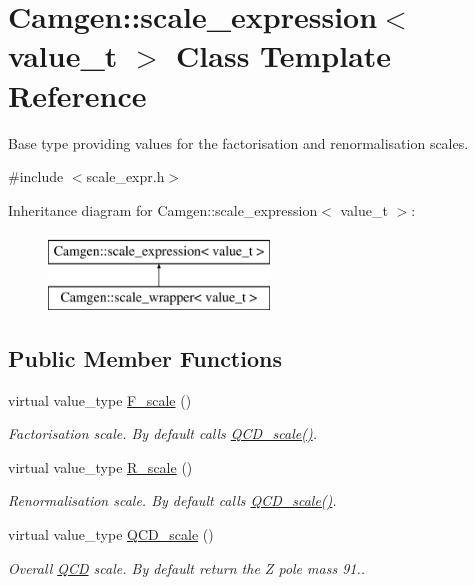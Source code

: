 \hypertarget{a00502}{}\section{Camgen\+:\+:scale\+\_\+expression$<$ value\+\_\+t $>$ Class Template Reference}
\label{a00502}


Base type providing values for the factorisation and renormalisation scales.  




{\ttfamily \#include $<$scale\+\_\+expr.\+h$>$}

Inheritance diagram for Camgen\+:\+:scale\+\_\+expression$<$ value\+\_\+t $>$\+:\begin{figure}[H]
\begin{center}
\leavevmode
\includegraphics[height=2.000000cm]{a00502}
\end{center}
\end{figure}
\subsection*{Public Member Functions}
\begin{DoxyCompactItemize}
\item 
\hypertarget{a00502_ae3e82d7b19e12aa8649fb97a5ae6e5ea}{}virtual value\+\_\+type \hyperlink{a00502_ae3e82d7b19e12aa8649fb97a5ae6e5ea}{F\+\_\+scale} ()\label{a00502_ae3e82d7b19e12aa8649fb97a5ae6e5ea}

\begin{DoxyCompactList}\small\item\em Factorisation scale. By default calls \hyperlink{a00502_aabc64b8eb844ec306c52f315770e9027}{Q\+C\+D\+\_\+scale()}. \end{DoxyCompactList}\item 
\hypertarget{a00502_a1f22c679e4695925cb84c145c91761c2}{}virtual value\+\_\+type \hyperlink{a00502_a1f22c679e4695925cb84c145c91761c2}{R\+\_\+scale} ()\label{a00502_a1f22c679e4695925cb84c145c91761c2}

\begin{DoxyCompactList}\small\item\em Renormalisation scale. By default calls \hyperlink{a00502_aabc64b8eb844ec306c52f315770e9027}{Q\+C\+D\+\_\+scale()}. \end{DoxyCompactList}\item 
\hypertarget{a00502_aabc64b8eb844ec306c52f315770e9027}{}virtual value\+\_\+type \hyperlink{a00502_aabc64b8eb844ec306c52f315770e9027}{Q\+C\+D\+\_\+scale} ()\label{a00502_aabc64b8eb844ec306c52f315770e9027}

\begin{DoxyCompactList}\small\item\em Overall \hyperlink{a00460}{Q\+C\+D} scale. By default return the Z pole mass 91.. \end{DoxyCompactList}\end{DoxyCompactItemize}



